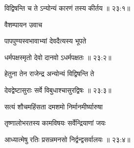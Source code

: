 {\devanagarifont विद्विषन्ति च ते ऽन्योन्यं कारणं तस्य कीर्तय {॥ २३:१॥} \veg\dontdisplaylinenum }%

{\devanagarifont वैशम्पायन उवाच {\dandab}\dontdisplaylinenum  }%
 
{\devanagarifont पापपुण्यस्वभावाभ्यां देवदैत्यस्य भूपते \thinspace{\danda} \dontdisplaylinenum }%
 

{\devanagarifont धर्मपक्षस्मृतो देवो दानवो ऽधर्मपक्षतः {॥ २३:२॥} \veg\dontdisplaylinenum }%

{\devanagarifont हेतुना तेन राजेन्द्र अन्योन्यं विद्विषन्ति ते \thinspace{\dandab} \dontdisplaylinenum }%
 

{\devanagarifont देवद्वेष्टासुराः सर्वे विबुधाश्चासुरद्विषः {॥ २३:३॥} \veg\dontdisplaylinenum }%


\ujvers{}    %


\nemslokab

{\devanagarifont सत्यं शौचमहिंसता दमशमो निर्मानमीर्ष्यारुषा  \danda\dontdisplaylinenum }%

\nemslokac

{\devanagarifont तृष्णालोभरतस्य कामविषयः सर्वेन्द्रियाणां जयः }%
  \dontdisplaylinenum


\nemslokad

{\devanagarifont आध्यात्मेषु रतिः प्रसन्नमनसो निर्द्वन्द्वसर्वालयः {॥ २३:४॥} \veg\dontdisplaylinenum }%

